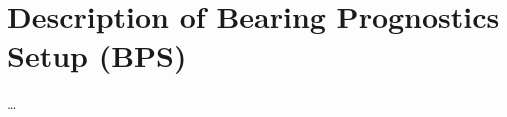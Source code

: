 \chapter{Description of Bearing Prognostics Setup (BPS)}\label{ch:myappendix1}

\ldots

\instructionsappendices


\cleardoublepage

